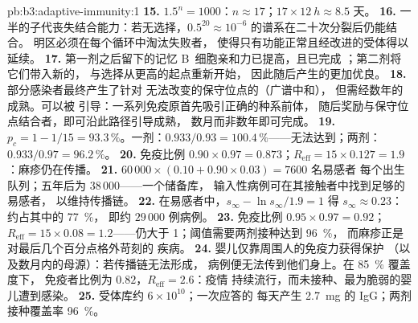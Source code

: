 \begin{solution}{pb:b3:adaptive-immunity:1}
\textbf{15.} $1.5^{n} = 1000$：$n \approx 17$；$17\times \qty{12}{h}
\approx 8.5$ 天。
\textbf{16.} 一半的子代丧失结合能力：若无选择，$0.5^{20}
\approx 10^{-6}$ 的谱系在二十次分裂后仍能结合。
明区必须在每个循环中淘汰失败者，
使得只有功能正常且经改进的受体得以延续。
\textbf{17.} 第一剂之后留下的记忆 B~细胞亲和力已提高，且已完成
；第二剂将它们带入新的，
与选择从更高的起点重新开始，
因此随后产生的更加优良。
\textbf{18.} 部分感染者最终产生了针对
无法改变的保守位点的（广谱中和），
但需经数年的成熟。可以被
引导：一系列免疫原首先吸引正确的种系前体，
随后奖励与保守位点结合者，即可沿此路径引导成熟，
数月而非数年即可完成。
\textbf{19.} $p_{c} = 1 - 1/15 = 93.3\,\%$。一剂：$0.933/0.93 =
100.4\,\%$——无法达到；两剂：$0.933/0.97 = 96.2\,\%$。
\textbf{20.} 免疫比例 $0.90\times 0.97 = 0.873$；$R_{\text{eff}} = 15\times
0.127 = 1.9$：麻疹仍在传播。
\textbf{21.} $60\,000\times (0.10 + 0.90\times 0.03) = 7600$ 名易感者
每个出生队列；五年后为 $38\,000$——一个储备库，
输入性病例可在其接触者中找到足够的易感者，
以维持传播链。
\textbf{22.} 在易感者中，$s_{\infty} - \ln s_{\infty}/1.9 =
1$ 得 $s_{\infty} \approx 0.23$：约占其中的 \qty{77}{\%}，
即约 $29\,000$ 例病例。
\textbf{23.} 免疫比例 $0.95\times 0.97 = 0.92$；$R_{\text{eff}} = 15\times
0.08 = 1.2$——仍大于 1；阈值需要两剂接种达到 \qty{96}{\%}，
而麻疹正是对最后几个百分点格外苛刻的
疾病。
\textbf{24.} 婴儿仅靠周围人的免疫力获得保护
（以及数月内的母源）：若传播链无法形成，
病例便无法传到他们身上。在 \qty{85}{\%} 覆盖度下，
免疫者比例为 $0.82$，$R_{\text{eff}} = 2.6$：疫情
持续流行，而未接种、最为脆弱的婴儿遭到感染。
\textbf{25.} 受体库约 $6\times 10^{10}$；一次应答的
每天产生 \qty{2.7}{mg} 的 IgG；两剂接种覆盖率 \qty{96}{\%}。
\end{solution}
